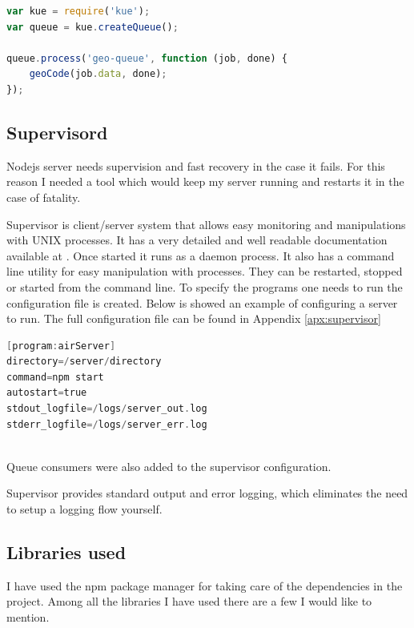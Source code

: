 \documentclass[thesis=M,english]{FITthesis}[2012/10/20]
\begin{document}
\begin{lstlisting}[language=JavaScript]
var kue = require('kue');
var queue = kue.createQueue();

queue.process('geo-queue', function (job, done) {
    geoCode(job.data, done);
});

\end{lstlisting}

\subsection{Supervisord}
 
Nodejs server needs supervision and fast recovery in the case it fails. For this reason I needed a tool which would keep my server running and restarts it in the case of fatality.

Supervisor is client/server system that allows easy monitoring and manipulations with UNIX processes. It has a very detailed and well readable documentation available at \cite{supervisor}. Once started it runs as a daemon process. It also has a command line utility for easy manipulation with processes. They can be restarted, stopped or started from the command line. To specify the programs one needs to run the configuration file is created. Below is showed an example of configuring a server to run. The full configuration file can be found in Appendix \ref{apx:supervisor} \\

\begin{lstlisting}[language=C]
[program:airServer]
directory=/server/directory
command=npm start
autostart=true 
stdout_logfile=/logs/server_out.log
stderr_logfile=/logs/server_err.log  
\end{lstlisting} \\
Queue consumers were also added to the supervisor configuration. 

Supervisor provides standard output and error logging, which eliminates the need to setup a logging flow yourself.

\subsection{Libraries used}

I have used the npm package manager for taking care of the dependencies in the project. Among all the libraries I have used there are a few I would like to mention.
\end{document}
